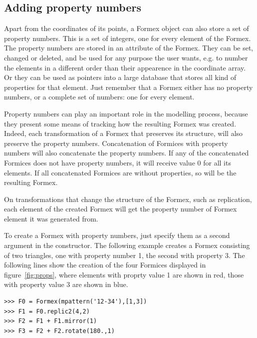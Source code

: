 \subsection{Adding property numbers}
\label{subsec:propnr}
Apart from the coordinates of its points, a Formex object can also store a set of property numbers. This is a set of integers, one for every element of the Formex.
The property numbers are stored in an attribute  of the Formex. They can be set, changed or deleted, and be used for any purpose the user wants, e.g. to number the elements in a different order than their appearence in the coordinate array. Or they can be used as pointers into a large database that stores all kind of properties for that element. Just remember that a Formex either has no property numbers, or a complete set of numbers: one for every element.

Property numbers can play an important role in the modelling process, because they present some means of tracking how the resulting Formex was created. Indeed, each transformation of a Formex that preserves its structure, will also preserve the property numbers. Concatenation of Formices with property numbers will also concatenate the property numbers. If any of the concatenated Formices does not have property numbers, it will receive value 0 for all its elements. If all concatenated Formices are without properties, so will be the resulting Formex.

On transformations that change the structure of the Formex, such as replication, each element of the created Formex will get the property number of Formex element it was generated from.

To create a Formex with property numbers, just specify them as a second argument in the constructor. The following example creates a Formex consisting of two triangles, one with property number 1, the second with property 3. The following lines show the creation of the four Formices displayed in figure~\ref{fig:props}, where elements with proprty value 1 are shown in red, those with property value 3 are shown in blue. 
\begin{verbatim}
>>> F0 = Formex(mpattern('12-34'),[1,3])
>>> F1 = F0.replic2(4,2)
>>> F2 = F1 + F1.mirror(1)
>>> F3 = F2 + F2.rotate(180.,1)
\end{verbatim}

